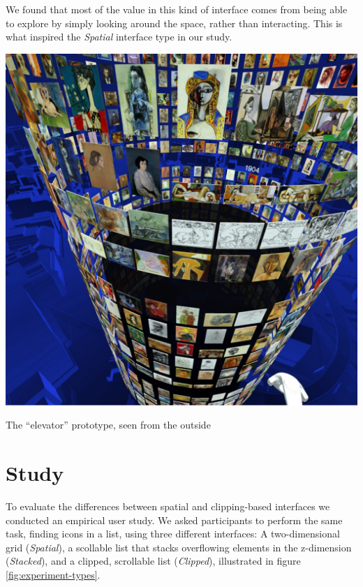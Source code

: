 \documentclass[nobib]{tufte-book} %
\begin{document}
We found that most of the value in this kind of interface comes from being able to explore by simply looking around the space, rather than interacting. This is what inspired the \emph{Spatial} interface type in our study.

\begin{marginfigure}
  \includegraphics[width=\linewidth]{picassooutside.jpg}
  \caption{The ``elevator'' prototype, seen from the outside}
  \label{fig:picassooutside}
\end{marginfigure}



\chapter{Study}
\label{ch:study}

To evaluate the differences between spatial and clipping-based interfaces we conducted an empirical user study. We asked participants to perform the same task, finding icons in a list, using three different interfaces: A two-dimensional grid (\emph{Spatial}), a scollable list that stacks overflowing elements in the z-dimension (\emph{Stacked}), and a clipped, scrollable list (\emph{Clipped}), illustrated in figure \ref{fig:experiment-types}.
\end{document}
